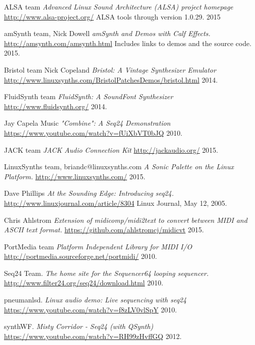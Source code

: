 \begin{thebibliography}{99}

   ALSA team
   \emph{Advanced Linux Sound Architecture (ALSA) project homepage}
   \url{http://www.alsa-project.org/}
   ALSA tools through version 1.0.29.
   2015

   amSynth team, Nick Dowell
   \emph{amSynth and Demos with Calf Effects.}
   \url{http://amsynth.com/amsynth.html}
   Includes links to demos and the source code.
   2015.

   Bristol team Nick Copeland
   \emph{Bristol: A Vintage Synthesizer Emulator}
   \url{http://www.linuxsynths.com/BristolPatchesDemos/bristol.html}
   2014.

   FluidSynth team
   \emph{FluidSynth: A SoundFont Synthesizer}
   \url{http://www.fluidsynth.org/}
   2014.

   Jay Capela Music
   \emph{"Combine": A Seq24 Demonstration}
   \url{https://www.youtube.com/watch?v=fUiXbVT0bJQ}
   2010.

   JACK team
   \emph{JACK Audio Connection Kit}
   \url{http://jackaudio.org/}
   2015.

   LinuxSynths team, briandc@linuxsynths.com
   \emph{A Sonic Palette on the Linux Platform.}
   \url{http://www.linuxsynths.com/}
   2015.

   Dave Phillips
   \emph{At the Sounding Edge: Introducing seq24.}
   \url{http://www.linuxjournal.com/article/8304}
   Linux Journal, May 12, 2005.

   Chris Ahlstrom
   \emph{Extension of midicomp/midi2text to convert between MIDI and ASCII
      text format.}
   \url{https://github.com/ahlstromcj/midicvt}
   2015.

   PortMedia team
   \emph{Platform Independent Library for MIDI I/O}
   \url{http://portmedia.sourceforge.net/portmidi/}
   2010.

   Seq24 Team.
   \emph{The home site for the Sequencer64 looping sequencer.}
   \url{http://www.filter24.org/seq24/download.html}
   2010.

   pneumanlsd.
   \emph{Linux audio demo: Live sequencing with seq24}
   \url{https://www.youtube.com/watch?v=f8zLV0vlSpY}
   2010.

   synthWF.
   \emph{Misty Corridor - Seq24 (with QSynth)}
   \url{https://www.youtube.com/watch?v=RH99zHvffGQ}
   2012.


\end{thebibliography}
